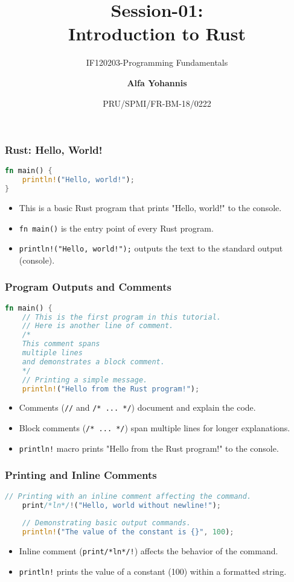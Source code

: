 \documentclass[aspectratio=169, table]{beamer}
\subtitle{IF120203-Programming Fundamentals}
\title{\LARGE{Session-01:\\Introduction to Rust}
\vspace{20pt}}
\date[Serial]{\scriptsize {PRU/SPMI/FR-BM-18/0222}}
\author[Pradita]{\small{\textbf{Alfa Yohannis}}}
\begin{document}
\frame{\titlepage}

\begin{frame}[fragile]
\frametitle{Rust: Hello, World!}
\begin{lstlisting}[language=Rust]
fn main() {
	println!("Hello, world!");
}
\end{lstlisting}
\begin{itemize}
\item This is a basic Rust program that prints "Hello, world!" to the console.
\item \texttt{fn main()} is the entry point of every Rust program.
\item \texttt{println!("Hello, world!");} outputs the text to the standard output (console).
\end{itemize}
\end{frame}

\begin{frame}[fragile]
\frametitle{Program Outputs and Comments}
\vspace{10pt}
\begin{lstlisting}[language=Rust]
fn main() {
	// This is the first program in this tutorial.
	// Here is another line of comment.
	/* 
	This comment spans 
	multiple lines 
	and demonstrates a block comment.
	*/
	// Printing a simple message.
	println!("Hello from the Rust program!");
\end{lstlisting}
\begin{itemize}
	\item Comments (\texttt{//} and \texttt{/* ... */}) document and explain the code.
	\item Block comments (\texttt{/* ... */}) span multiple lines for longer explanations.
	\item \texttt{println!} macro prints "Hello from the Rust program!" to the console.
\end{itemize}
\end{frame}


\begin{frame}[fragile]
\frametitle{Printing and Inline Comments}
\begin{lstlisting}[language=Rust]
	// Printing with an inline comment affecting the command.
	print/*ln*/!("Hello, world without newline!");
	
	// Demonstrating basic output commands.
	println!("The value of the constant is {}", 100);
\end{lstlisting}
\begin{itemize}
	\item Inline comment (\texttt{print/*ln*/!}) affects the behavior of the command.
	\item \texttt{println!} prints the value of a constant (100) within a formatted string.
\end{itemize}
\end{frame}
\end{document}
